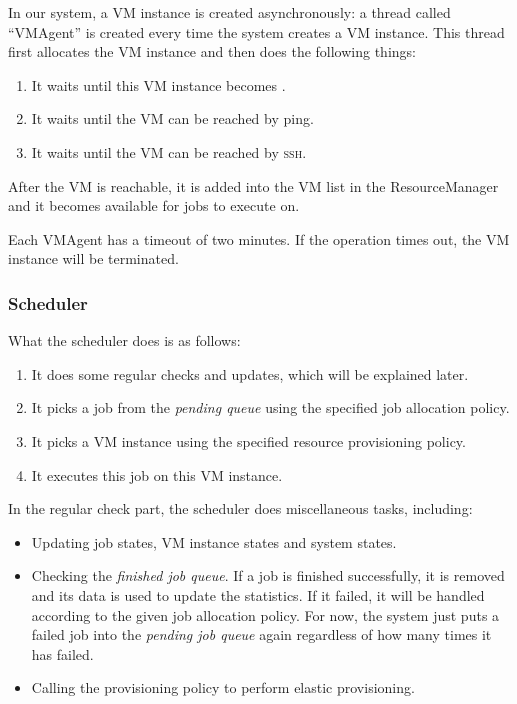 In our system, a VM instance is created asynchronously: a
thread called ``VMAgent'' is created every time the system creates a
VM instance. This thread first allocates the VM instance and then
does the following things:

\begin{enumerate}
\item It waits until this VM instance becomes \staterunning.
\item It waits until the VM can be reached by ping.
\item It waits until the VM can be reached by \textsc{ssh}.
\end{enumerate}

After the VM is reachable, it is added into the VM list in the
ResourceManager and it becomes available for jobs to execute on.

Each VMAgent has a timeout of two minutes. If the operation times out,
the VM instance will be terminated.

\subsubsection{Scheduler}
What the scheduler does is as follows:

\begin{enumerate}
\item It does some regular checks and updates, which will be explained
  later.
\item It picks a job from the \emph{pending queue} using the specified
  job allocation policy.
\item It picks a VM instance using the specified resource provisioning
  policy.
\item It executes this job on this VM instance.
\end{enumerate}

In the regular check part, the scheduler does miscellaneous tasks,
including:
\begin{itemize}
\item Updating job states, VM instance states and system states.
\item Checking the \emph{finished job queue}. If a job is finished
  successfully, it is removed and its data is used to update the
  statistics. If it failed, it will be handled according to the given
  job allocation policy. For now, the system just puts a failed job into
  the \emph{pending job queue} again regardless of how many times it
  has failed.
\item Calling the provisioning policy to perform elastic provisioning.
\end{itemize}

